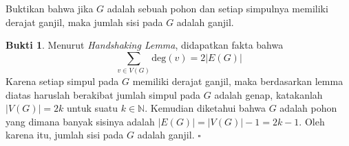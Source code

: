 \documentclass[a4paper]{article}
\theoremstyle{definition}
\newtheorem*{bukti}{Bukti}
\newcommand{\N}{\mathbb{N}}
\begin{document}
\pagestyle{fancy}
\noindent Buktikan bahwa jika \(G\) adalah sebuah pohon dan setiap simpulnya memiliki derajat ganjil, maka jumlah sisi pada \(G\) adalah ganjil.
\begin{bukti}
Menurut \textit{Handshaking Lemma}, didapatkan fakta bahwa 
\[\sum_{v \in V(G)} \text{deg}(v) = 2|E(G)|\]
Karena setiap simpul pada \(G\) memiliki derajat ganjil, maka berdasarkan lemma diatas haruslah berakibat jumlah simpul pada \(G\) adalah genap, katakanlah \(|V(G)| = 2k\) untuk suatu $k\in\N$. Kemudian diketahui bahwa \(G\) adalah pohon yang dimana banyak sisinya adalah \(|E(G)| = |V(G)| - 1 = 2k - 1\). Oleh karena itu, jumlah sisi pada \(G\) adalah ganjil. $\square$
\end{bukti}
\end{document}
